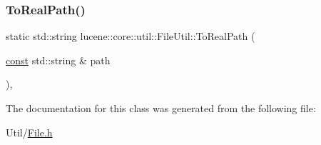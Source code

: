 \mbox{\label{classlucene_1_1core_1_1util_1_1FileUtil_a07d88b9c9d327de8bef27ed90a22e0ef}} 
\subsubsection{\texorpdfstring{To\+Real\+Path()}{ToRealPath()}}
{\footnotesize\ttfamily static std\+::string lucene\+::core\+::util\+::\+File\+Util\+::\+To\+Real\+Path (\begin{DoxyParamCaption}\item[{\mbox{\hyperlink{ZlibCrc32_8h_a2c212835823e3c54a8ab6d95c652660e}{const}} std\+::string \&}]{path }\end{DoxyParamCaption})\hspace{0.3cm}{\ttfamily [inline]}, {\ttfamily [static]}}



The documentation for this class was generated from the following file\+:\begin{DoxyCompactItemize}
\item 
Util/\mbox{\hyperlink{Util_2File_8h}{File.\+h}}\end{DoxyCompactItemize}
